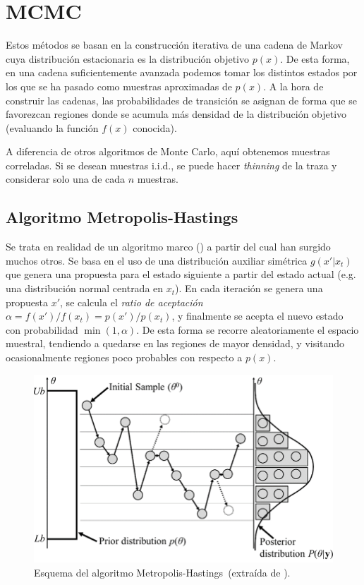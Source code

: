 \documentclass[
  a4paper,
	fontsize=11pt, %
	twoside=false, %
  secnumdepth=2,
	numbers=noenddot, %
]{kaohandt}
\begin{document}
\section{MCMC}

Estos métodos se basan en la construcción iterativa de una cadena de Markov cuya distribución estacionaria es la distribución objetivo \(p(x)\). De esta forma, en una cadena suficientemente avanzada podemos tomar los distintos estados por los que se ha pasado como muestras aproximadas de \(p(x)\). A la hora de construir las cadenas, las probabilidades de transición se asignan de forma que se favorezcan regiones donde se acumula más densidad de la distribución objetivo (evaluando la función \(f(x)\) conocida). 

A diferencia de otros algoritmos de Monte Carlo, aquí obtenemos muestras correladas. Si se desean muestras i.i.d., se puede hacer \textit{thinning} de la traza y considerar solo una de cada \(n\) muestras.

\subsection{Algoritmo Metropolis-Hastings}

Se trata en realidad de un algoritmo marco () a partir del cual han surgido muchos otros. Se basa en el uso de una distribución auxiliar simétrica \(g(x'| x_t)\) que genera una propuesta para el estado siguiente a partir del estado actual (e.g. una distribución normal centrada en \(x_t\)). En cada iteración se genera una propuesta \(x'\), se calcula el \textit{ratio de aceptación} \(\alpha=f(x')/f(x_t)=p(x')/p(x_t)\), y finalmente se acepta el nuevo estado con probabilidad \(\min(1, \alpha)\). De esta forma se recorre aleatoriamente el espacio muestral, tendiendo a quedarse en las regiones de mayor densidad, y visitando ocasionalmente regiones poco probables con respecto a \(p(x)\).

\begin{figure}[h!]
  \includegraphics[width=.7\textwidth]{mh}
  \caption{Esquema del algoritmo Metropolis-Hastings~(extraída de \cite{jaewook2015metamodel}).}
\end{figure}
\end{document}
